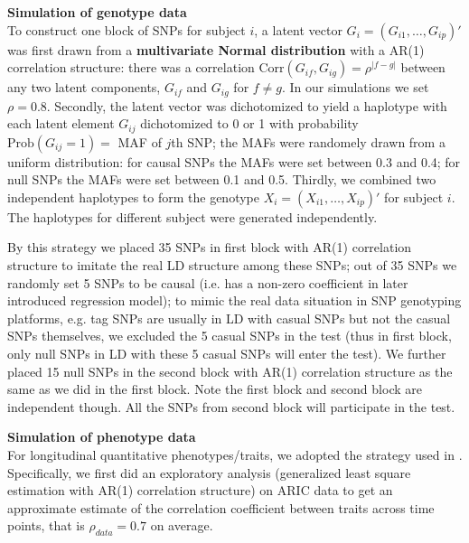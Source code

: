 \documentclass[12pt]{article}
\begin{document}
\textbf{Simulation of genotype data}\\
To construct one block of SNPs for subject $i$, a latent vector $G_i = (G_{i1}, \ldots, G_{ip})'$ was first drawn from a \textbf{multivariate Normal distribution} with a AR(1) correlation structure: there was a correlation $\textrm{Corr} (G_{if}, G_{ig}) = \rho ^ { |f - g| }$ between any two latent components, $G_{if}$ and $G_{ig}$ for $f \neq g$. In our simulations we set $\rho = 0.8$. Secondly, the latent vector was dichotomized to yield a haplotype with each latent element $G_{ij}$ dichotomized to 0 or 1 with probability $\textrm{Prob} (G_{ij} = 1) = $ MAF of $j$th SNP; the MAFs were randomely drawn from a uniform distribution: for causal SNPs the MAFs were set between 0.3 and 0.4; for null SNPs the MAFs were set between 0.1 and 0.5. Thirdly, we combined two independent haplotypes to form the genotype $X_i = (X_{i1}, \ldots, X_{ip})' $ for subject $i$. The haplotypes for different subject were generated independently.

By this strategy we placed 35 SNPs in first block with AR(1) correlation structure to imitate the real LD structure among these SNPs; out of 35 SNPs we randomly set 5 SNPs to be causal (i.e. has a non-zero coefficient in later introduced regression model); to mimic the real data situation in SNP genotyping platforms, e.g. tag SNPs are usually in LD with casual SNPs but not the casual SNPs themselves, we excluded the 5 casual SNPs in the test (thus in first block, only null SNPs in LD with these 5 casual SNPs will enter the test). We further placed 15 null SNPs in the second block with AR(1) correlation structure as the same as we did in the first block. Note the first block and second block are independent though. All the SNPs from second block will participate in the test.

\textbf{Simulation of phenotype data}\\
For longitudinal quantitative phenotypes/traits, we adopted the strategy used in \cite{Song2013}. Specifically, we first did an exploratory analysis (generalized least square estimation with AR(1) correlation structure) on ARIC data to get an approximate estimate of the correlation coefficient between traits across time points, that is $\rho_{data} = 0.7$ on average. 
\end{document}

